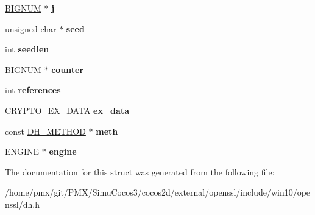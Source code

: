 \begin{DoxyCompactItemize}
\hyperlink{structbignum__st}{B\+I\+G\+N\+UM} $\ast$ {\bfseries j}
\item 
\mbox{\label{structdh__st_ae0d5af379d1113d5d2c402f9d2d85d49}} 
unsigned char $\ast$ {\bfseries seed}
\item 
\mbox{\label{structdh__st_a07d3bf5a4dcd263d27d42c92c74d42ef}} 
int {\bfseries seedlen}
\item 
\mbox{\label{structdh__st_a68f2d92b8bc2abd3f0f1d31b061eaf07}} 
\hyperlink{structbignum__st}{B\+I\+G\+N\+UM} $\ast$ {\bfseries counter}
\item 
\mbox{\label{structdh__st_a12e77dc7593509a21bf3362b97f472b7}} 
int {\bfseries references}
\item 
\mbox{\label{structdh__st_a82bd75ac9a0b1c3a698c28a87e56a78f}} 
\hyperlink{structcrypto__ex__data__st}{C\+R\+Y\+P\+T\+O\+\_\+\+E\+X\+\_\+\+D\+A\+TA} {\bfseries ex\+\_\+data}
\item 
\mbox{\label{structdh__st_ae98dc2f23940781bceeb2b4cb931a2a3}} 
const \hyperlink{structdh__method}{D\+H\+\_\+\+M\+E\+T\+H\+OD} $\ast$ {\bfseries meth}
\item 
\mbox{\label{structdh__st_ab4369fbdcf15e3937755fd06420bd5b5}} 
E\+N\+G\+I\+NE $\ast$ {\bfseries engine}
\end{DoxyCompactItemize}


The documentation for this struct was generated from the following file\+:\begin{DoxyCompactItemize}
\item 
/home/pmx/git/\+P\+M\+X/\+Simu\+Cocos3/cocos2d/external/openssl/include/win10/openssl/dh.\+h\end{DoxyCompactItemize}
